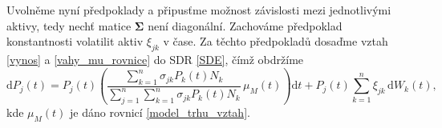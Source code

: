 \documentclass[a4paper,12pt]{report}
\theoremstyle{definition} \newtheorem{definice}[veta]{Definice}
\theoremstyle{remark}
\begin{document}

Uvolněme nyní předpoklady a připusťme možnost závislosti mezi jednotlivými aktivy, tedy nechť matice $\boldsymbol{\Sigma}$ není diagonální.
Zachováme předpoklad konstantnosti volatilit aktiv $\xi_{jk}$ v čase.
Za těchto předpokladů dosaďme vztah \eqref{vynos} a \eqref{vahy_mu_rovnice} do SDR \eqref{SDE}, čímž obdržíme
\begin{equation} \label{SDE_cen}
 \mathrm{d}P_j(t)=P_j(t)\left(\frac{\sum\limits_{k=1}^n\sigma_{jk}P_k(t)N_k}{\sum\limits_{j=1}^n\sum\limits_{k=1}^n\sigma_{jk}P_k(t)N_k}\, \mu_M(t)\right)\mathrm{d}t+P_j(t)\sum_{k=1}^{n}\xi_{jk}\,\mathrm{d}W_k(t),
\end{equation}
kde $\mu_M(t)$ je dáno rovnicí \eqref{model_trhu_vztah}.
\end{document}
